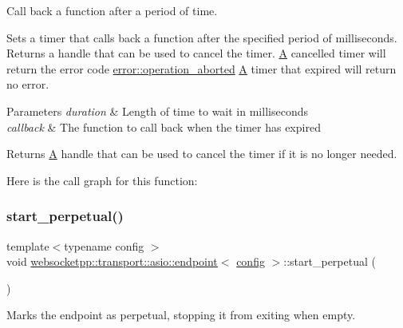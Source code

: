 Call back a function after a period of time. 

Sets a timer that calls back a function after the specified period of milliseconds. Returns a handle that can be used to cancel the timer. \mbox{\hyperlink{struct_a}{A}} cancelled timer will return the error code \mbox{\hyperlink{namespacewebsocketpp_1_1transport_1_1error_a8d371a2562d813e5a2e106e2694d4fb0a887436887a8732e48f7c67bd85bb6f64}{error\+::operation\+\_\+aborted}} \mbox{\hyperlink{struct_a}{A}} timer that expired will return no error.


\begin{DoxyParams}{Parameters}
{\em duration} & Length of time to wait in milliseconds \\
\hline
{\em callback} & The function to call back when the timer has expired \\
\hline
\end{DoxyParams}
\begin{DoxyReturn}{Returns}
\mbox{\hyperlink{struct_a}{A}} handle that can be used to cancel the timer if it is no longer needed. 
\end{DoxyReturn}
Here is the call graph for this function\+:
\mbox{\label{classwebsocketpp_1_1transport_1_1asio_1_1endpoint_a5a707078d482c141edf0a8cdd0bc6345}} 
\subsubsection{\texorpdfstring{start\+\_\+perpetual()}{start\_perpetual()}}
{\footnotesize\ttfamily template$<$typename config $>$ \\
void \mbox{\hyperlink{classwebsocketpp_1_1transport_1_1asio_1_1endpoint}{websocketpp\+::transport\+::asio\+::endpoint}}$<$ \mbox{\hyperlink{classconfig}{config}} $>$\+::start\+\_\+perpetual (\begin{DoxyParamCaption}{ }\end{DoxyParamCaption})\hspace{0.3cm}{\ttfamily [inline]}}



Marks the endpoint as perpetual, stopping it from exiting when empty. 

